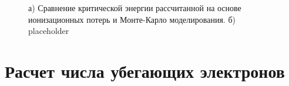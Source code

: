 \begin{figure}[t]
    \begin{center}
        \begin{minipage}[h]{0.49\linewidth}
        \end{minipage}
        \hfill
        \begin{minipage}[h]{0.49\linewidth}
        \end{minipage}
        \caption{а) Сравнение критической энергии рассчитанной на основе ионизационных потерь и Монте-Карло моделирования. б) placeholder}
    \end{center}
    \label{fig:storm:gurevich}
\end{figure}

\section{Расчет числа убегающих электронов}\label{sec:thunderstorm/rrea}

